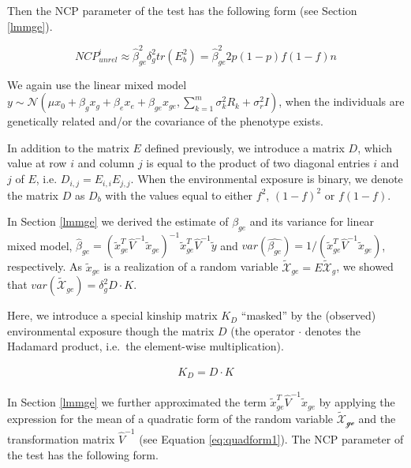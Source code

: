 \documentclass[]{book}
\theoremstyle{definition}
\theoremstyle{definition}
\theoremstyle{definition}
\theoremstyle{remark}
\begin{document}
Then the NCP parameter of the test has the following form (see Section
\ref{lmmge}).

\begin{equation} 
NCP_{unrel}^i \approx \hat{\beta}_{ge}^2 \delta_g^2 tr(E_b^2) = \hat{\beta}_{ge}^2 2 p (1 - p) f (1 - f) n 
\label{eq:ncpgeun}
\end{equation}

We again use the linear mixed model
\(y \sim \mathcal{N} (\mu x_0 + \beta_g x_g + \beta_e x_e + \beta_{ge} x_{ge}, \sum_{k=1}^{m}{\sigma_k^2 R_k} + \sigma_r^2 I)\),
when the individuals are genetically related and/or the covariance of
the phenotype exists.

In addition to the matrix \(E\) defined previously, we introduce a
matrix \(D\), which value at row \(i\) and column \(j\) is equal to the
product of two diagonal entries \(i\) and \(j\) of \(E\), i.e.
\(D_{i,j} = E_{i,i} E_{j,j}\). When the environmental exposure is
binary, we denote the matrix \(D\) as \(D_b\) with the values equal to
either \(f^2\), \((1 - f)^2\) or \(f (1 - f)\).

In Section \ref{lmmge} we derived the estimate of \(\beta_{ge}\) and its
variance for linear mixed model,
\(\hat{\beta}_{ge} = (\tilde{x}_{ge}^T \hat{V}^{-1} \tilde{x}_{ge})^{-1} \tilde{x}_{ge}^T \hat{V}^{-1} \tilde{y}\)
and
\(var(\hat{\beta_{ge}}) = 1 / (\tilde{x}_{ge}^T \hat{V}^{-1} \tilde{x}_{ge})\),
respectively. As \(\tilde{x}_{ge}\) is a realization of a random
variable \(\mathcal{\tilde{X}}_{ge} = E \mathcal{\tilde{X}}_{g}\), we
showed that \(var(\mathcal{\tilde{X}}_{ge}) = \delta_g^2 D \cdot K\).

Here, we introduce a special kinship matrix \(K_{D}\) ``masked'' by the
(observed) environmental exposure though the matrix \(D\) (the operator
\(\cdot\) denotes the Hadamard product, i.e.~the element-wise
multiplication).

\begin{equation} 
\begin{split}
K_{D} =  D \cdot K
\end{split}
\label{eq:kdmat}
\end{equation}

In Section \ref{lmmge} we further approximated the term
\(\tilde{x}_{ge}^T \hat{V}^{-1} \tilde{x}_{ge}\) by applying the
expression for the mean of a quadratic form of the random variable
\(\mathcal{\tilde{X}_{ge}}\) and the transformation matrix
\(\hat{V}^{-1}\) (see Equation \eqref{eq:quadform1}). The NCP parameter of
the test has the following form.
\end{document}
